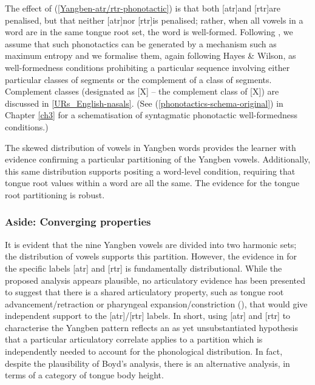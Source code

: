 The effect of (\ref{Yangben-atr/rtr-phonotactic}) is that both [atr]\czero[rtr] and [rtr]\czero[atr] are penalised, but that neither [atr]\czero[atr] nor [rtr]\czero[rtr] is penalised; rather, when all vowels in a word are in the same tongue root set, the word is well-formed. Following \citet{Hayes+:2008}, we assume that such phonotactics can be generated by a mechanism such as maximum entropy and we formalise them, again following Hayes \& Wilson, as  well-formedness conditions prohibiting a particular sequence involving either particular classes of segments  or the complement of a class of segments. Complement classes (designated as [\up{$\wedge$}X] -- the complement class of [X]) are discussed in \Sec\ref{URs_English-nasals}. (See (\ref{phonotactics-schema-original}) in Chapter \ref{ch3} for a schematisation of syntagmatic phonotactic well-formedness conditions.)
 

The skewed distribution of vowels in Yangben  words provides the learner with evidence confirming a particular partitioning of the Yangben  vowels. Additionally, this same distribution supports positing a word-level condition, requiring that tongue root values within a word are all the same. The evidence for the tongue root partitioning is robust. 
 
 \largerpage
\subsubsection{Aside: Converging properties}\label{box-Yangben_alternative}

It is evident that the nine Yangben  vowels are divided into two harmonic sets; the distribution of vowels supports this partition. However, the evidence in \citet{Boyd:2015} for the specific labels [atr] and [rtr] is fundamentally distributional. While the proposed analysis appears plausible, no articulatory evidence has been presented to suggest that there is a shared articulatory property, such as tongue root advancement/retraction or pharyngeal expansion/constriction (\citealt{Lindau:1972, Lindau:1978}), that would give independent support to the [atr]/[rtr] labels. In short, using [atr] and [rtr] to characterise the Yangben pattern  reflects an as yet unsubstantiated hypothesis  that a particular articulatory correlate  applies to a partition which is independently needed to account for the phonological distribution. In fact, despite the plausibility of Boyd's analysis, there is an alternative analysis, in terms of a category of tongue body height. 

